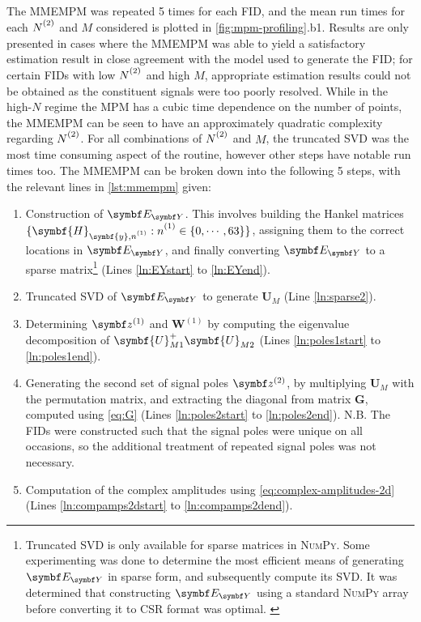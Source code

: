 The \ac{MMEMPM} was repeated 5 times for each \ac{FID}, and the mean run
times for each $\Ntwo$ and $M$ considered is plotted in
\cref{fig:mpm-profiling}.b1.
Results are only presented in cases where the \ac{MMEMPM} was able to yield a
satisfactory estimation result in close agreement with the model used to
generate the \ac{FID}; for certain \acp{FID} with low
$\Ntwo$ and high $M$, appropriate estimation results could not be obtained as
the constituent signals were too poorly resolved.
While in the high-$N$ regime the \ac{MPM} has a cubic time dependence
on the number of points, the \ac{MMEMPM} can be seen to have an approximately
quadratic complexity regarding $\Ntwo$.
For all combinations of $\Ntwo$ and $M$,
the truncated \ac{SVD} was the most time consuming aspect of the routine,
however other steps have notable run times too. The \ac{MMEMPM} can be broken
down into the following 5 steps, with the relevant lines in \cref{lst:mmempm}
given:
\begin{enumerate}
    \item Construction of $\EY$. This involves building the Hankel matrices
        $\lbrace \symbf{H}_{\symbf{y},\none} : \none \in \lbrace 0, \cdots, 63
        \rbrace \rbrace$, assigning them to the
        correct locations in $\EY$, and finally converting  $\EY$ to a sparse
        matrix\footnote{
            Truncated \ac{SVD} is only available for sparse matrices in
            \textsc{NumPy}\cite{svds}. Some experimenting was done to determine
            the most efficient means of generating $\EY$ in sparse form, and
            subsequently compute its \ac{SVD}.
            It was determined that constructing $\EY$ using a
            standard \textsc{NumPy} array before converting it to
            \ac{CSR} format\cite{csr} was optimal.
            \label{fn:sparse-svd}
        } (Lines \ref{ln:EYstart} to \ref{ln:EYend}).
    \item Truncated \ac{SVD} of $\EY$ to generate $\symbf{U}_M$ (Line \ref{ln:sparse2}).
    \item Determining $\bdzone$ and  $\symbf{W}^{(1)}$ by computing the
        eigenvalue decomposition of $\symbf{U}_{M1}^+ \symbf{U}_{M2}^{\vphantom{+}}$ (Lines
        \ref{ln:poles1start} to \ref{ln:poles1end}).
    \item Generating the second set of signal poles $\bdztwo$, by
        multiplying $\symbf{U}_M$ with the permutation matrix, and extracting
        the diagonal from matrix $\symbf{G}$, computed using \cref{eq:G} (Lines
        \ref{ln:poles2start} to \ref{ln:poles2end}). N.B. The \acp{FID} were
        constructed such that the signal poles were unique on all occasions, so
        the additional treatment of repeated signal poles was not necessary.
    \item Computation of the complex amplitudes using
        \cref{eq:complex-amplitudes-2d} (Lines \ref{ln:compamps2dstart} to
        \ref{ln:compamps2dend}).
\end{enumerate}
